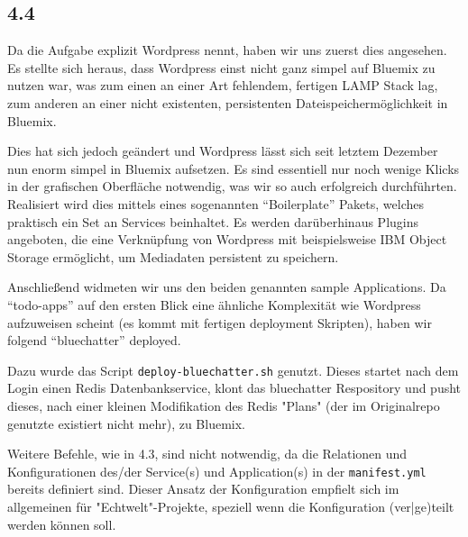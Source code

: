 
\subsection{4.4}

Da die Aufgabe explizit Wordpress nennt, haben wir uns zuerst dies angesehen.
Es stellte sich heraus, dass Wordpress einst nicht ganz simpel auf Bluemix zu nutzen war, was zum einen an einer Art fehlendem, fertigen LAMP Stack lag, zum anderen an einer nicht existenten, persistenten Dateispeichermöglichkeit in Bluemix.

Dies hat sich jedoch geändert und Wordpress lässt sich seit letztem Dezember nun enorm simpel in Bluemix aufsetzen.
Es sind essentiell nur noch wenige Klicks in der grafischen Oberfläche notwendig, was wir so auch erfolgreich durchführten.
Realisiert wird dies mittels eines sogenannten \enquote{Boilerplate} Pakets, welches praktisch ein Set an Services beinhaltet.
Es werden darüberhinaus Plugins angeboten, die eine Verknüpfung von Wordpress mit beispielsweise IBM Object Storage ermöglicht, um Mediadaten persistent zu speichern.

Anschließend widmeten wir uns den beiden genannten sample Applications.
Da \enquote{todo-apps} auf den ersten Blick eine ähnliche Komplexität wie Wordpress aufzuweisen scheint (es kommt mit fertigen deployment Skripten), haben wir folgend \enquote{bluechatter} deployed.

Dazu wurde das Script \texttt{deploy-bluechatter.sh} genutzt.
Dieses startet nach dem Login einen Redis Datenbankservice, klont das bluechatter Respository und pusht dieses, nach einer kleinen Modifikation des Redis "Plans" (der im Originalrepo genutzte existiert nicht mehr), zu Bluemix.

Weitere Befehle, wie in 4.3, sind nicht notwendig, da die Relationen und Konfigurationen des/der Service(s) und Application(s) in der \texttt{manifest.yml} bereits definiert sind.
Dieser Ansatz der Konfiguration empfielt sich im allgemeinen für "Echtwelt"-Projekte, speziell wenn die Konfiguration (ver|ge)teilt werden können soll.
